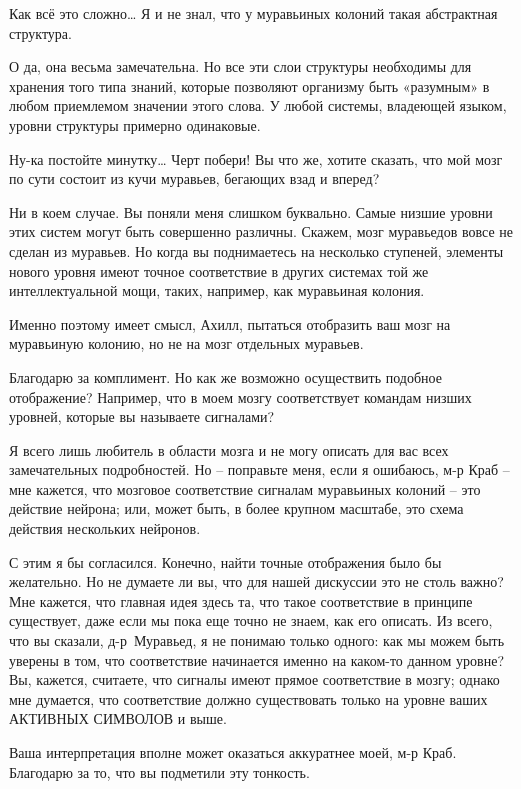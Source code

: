 \documentclass[../main.tex]{subfiles}
\begin{document}
\begin{dialogue}
 Как всё это сложно\ldots{} Я и не знал, что у муравьиных колоний такая абстрактная структура.

 О да, она весьма замечательна. Но все эти слои структуры необходимы для хранения того типа знаний, которые позволяют организму быть «разумным» в любом приемлемом значении этого слова. У любой системы, владеющей языком, уровни структуры примерно одинаковые.

 Ну-ка постойте минутку\ldots{} Черт побери! Вы что же, хотите сказать, что мой мозг по сути состоит из кучи муравьев, бегающих взад и вперед?

 Ни в коем случае. Вы поняли меня слишком буквально. Самые низшие уровни этих систем могут быть совершенно различны. Скажем, мозг муравьедов вовсе не сделан из муравьев. Но когда вы поднимаетесь на несколько ступеней, элементы нового уровня имеют точное соответствие в других системах той же интеллектуальной мощи, таких, например, как муравьиная колония.

 Именно поэтому имеет смысл, Ахилл, пытаться отобразить ваш мозг на муравьиную колонию, но не на мозг отдельных муравьев.

 Благодарю за комплимент. Но как же возможно осуществить подобное отображение? Например, что в моем мозгу соответствует командам низших уровней, которые вы называете сигналами?

 Я всего лишь любитель в области мозга и не могу описать для вас всех замечательных подробностей. Но \--- поправьте меня, если я ошибаюсь, м-р Краб \--- мне кажется, что мозговое соответствие сигналам муравьиных колоний \--- это действие нейрона; или, может быть, в более крупном масштабе, это схема действия нескольких нейронов.

 С этим я бы согласился. Конечно, найти точные отображения было бы желательно. Но не думаете ли вы, что для нашей дискуссии это не столь важно? Мне кажется, что главная идея здесь та, что такое соответствие в принципе существует, даже если мы пока еще точно не знаем, как его описать. Из всего, что вы сказали, д-р~Муравьед, я не понимаю только одного: как мы можем быть уверены в том, что соответствие начинается именно на каком-то данном уровне? Вы, кажется, считаете, что сигналы имеют прямое соответствие в мозгу; однако мне думается, что соответствие должно существовать только на уровне ваших АКТИВНЫХ СИМВОЛОВ и выше.

 Ваша интерпретация вполне может оказаться аккуратнее моей, м-р Краб. Благодарю за то, что вы подметили эту тонкость.


\end{dialogue}
\end{document}
